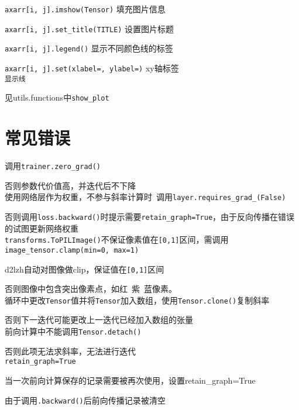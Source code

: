 \documentclass[UTF8]{ctexart}
\begin{document}
  \quad \quad \texttt{axarr[i, j].imshow(Tensor)} 填充图片信息

  \quad \quad \texttt{axarr[i, j].set\_title(TITLE)} 设置图片标题

  \quad \quad \texttt{axarr[i, j].legend()} 显示不同颜色线的标签

  \quad \quad \texttt{axarr[i, j].set(xlabel=, ylabel=)} xy轴标签\\
\texttt{显示线}

  见utils.functions中\texttt{show\_plot}

\section{常见错误}
\noindent 调用\texttt{trainer.zero\_grad()}

  否则参数代价值高，并迭代后不下降\\
使用网络层作为权重，不参与斜率计算时\ 调用\texttt{layer.requires\_grad\_(False)}

  否则调用\texttt{loss.backward()}时提示需要\texttt{retain\_graph=True}，由于反向传播在错误的试图更新网络权重\\
\texttt{transforms.ToPILImage()}不保证像素值在\texttt{[0,1]}区间，需调用\texttt{image\_tensor.clamp(min=0, max=1)}

  d2lzh自动对图像做clip，保证值在\texttt{[0,1]}区间
  
  否则图像中包含突出像素点，如红\ 紫\ 蓝像素。\\
循环中更改\texttt{Tensor}值并将\texttt{Tensor}加入数组，使用\texttt{Tensor.clone()}复制斜率

  否则下一迭代可能更改上一迭代已经加入数组的张量\\
前向计算中不能调用\texttt{Tensor.detach()}

  否则此项无法求斜率，无法进行迭代\\
\texttt{retain\_graph=True}

  当一次前向计算保存的记录需要被再次使用，设置retain\_graph=True 

  由于调用\texttt{.backward()}后前向传播记录被清空
\end{document}
